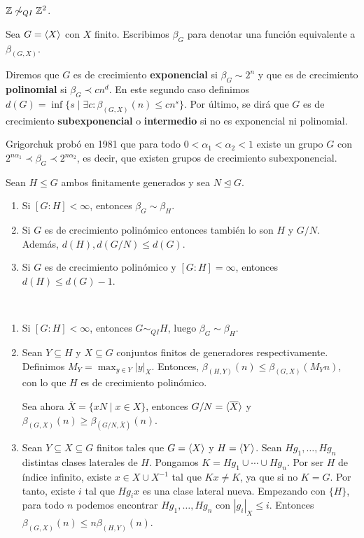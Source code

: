 \documentclass[twoside, 11pt]{article}
\begin{document}
\begin{coro}
$\mathbb{Z}\not\sim_{QI}\mathbb{Z}^2$.
\end{coro}

Sea $G=\langle{X}\rangle$ con $X$ finito. Escribimos $\beta_G$ para denotar una función equivalente a $\beta_{(G,X)}$.

\begin{defi}
Diremos que $G$ es de crecimiento \textbf{exponencial} si $\beta_G\sim 2^n$ y que es de crecimiento \textbf{polinomial} si $\beta_G\prec cn^d$. En este segundo caso definimos $d(G)=\inf\{s\mid \exists c:\beta_{(G,X)}(n)\leq cn^s\}$. Por último, se dirá que $G$ es de crecimiento \textbf{subexponencial} o \textbf{intermedio} si no es exponencial ni polinomial. 
\end{defi}
Grigorchuk probó en 1981 que para todo $0<\alpha_1<\alpha_2<1$ existe un grupo $G$ con $2^{n\alpha_1}\prec \beta_G\prec 2^{n\alpha_2}$, es decir, que existen grupos de crecimiento subexponencial. 

\begin{prop}
Sean $H\leq G$ ambos finitamente generados y sea $N\trianglelefteq G$.
\begin{enumerate}
\item Si $[G:H]<\infty$, entonces $\beta_G\sim\beta_H$.
\item Si $G$ es de crecimiento polinómico entonces también lo son $H$ y $G/N$. Además, $d(H),d(G/N)\leq d(G)$.
\item Si $G$ es de crecimiento polinómico y $[G:H]=\infty$, entonces $d(H)\leq d(G)-1$.
\end{enumerate}
\end{prop}
\begin{dem}\
\begin{enumerate}
\item Si $[G:H]<\infty$, entonces $G\sim_{QI} H$, luego $\beta_G\sim\beta_H$.
\item Sean $Y\subseteq H$ y $X\subseteq G$ conjuntos finitos de generadores respectivamente. Definimos $M_Y=\max_{y\in Y}|y|_X$. Entonces, $\beta_{(H,Y)}(n)\leq \beta_{(G,X)}(M_Y n)$, con lo que $H$ es de crecimiento polinómico.

Sea ahora $\overline{X}=\{xN\mid x\in X\}$, entonces $G/N=\langle{\overline{X}}\rangle$ y $\beta_{(G,X)}(n)\geq \beta_{(G/N,\overline{X})}(n)$. 

\item Sean $Y\subseteq X\subseteq G$ finitos tales que $G=\langle{X}\rangle$ y $H=\langle{Y}\rangle$. Sean $Hg_1,\dots, Hg_n$ distintas clases laterales de $H$. Pongamos $K=Hg_1\cup\cdots\cup Hg_n$. Por ser $H$ de índice infinito, existe $x\in X\cup X^{-1}$ tal que $Kx\neq K$, ya que si no $K=G$. Por tanto, existe $i$ tal que $Hg_ix$ es una clase lateral nueva. Empezando con $\{H\}$, para todo $n$ podemos encontrar $Hg_1,\dots, Hg_n$ con $|g_i|_X\leq i$. Entonces $\beta_{(G,X)}(n)\leq n\beta_{(H,Y)}(n)$.\QED
\end{enumerate}
\end{dem}
\end{document}
